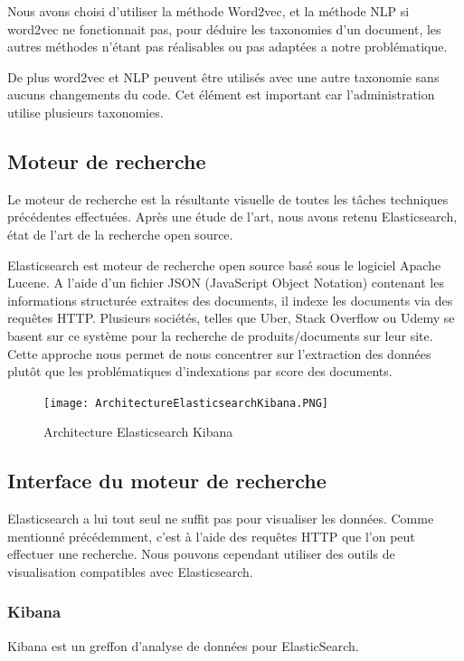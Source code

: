 Nous avons choisi d'utiliser la méthode Word2vec, et la méthode NLP si word2vec ne fonctionnait pas, pour déduire les taxonomies d'un document, les autres méthodes n'étant pas réalisables ou pas adaptées a notre problématique.

De plus word2vec et NLP peuvent être utilisés avec une autre taxonomie sans aucuns changements du code.
Cet élément est important car l'administration utilise plusieurs taxonomies. 


\subsection{Moteur de recherche}
Le moteur de recherche est la résultante visuelle de toutes les tâches techniques précédentes effectuées.
Après une étude de l’art, nous avons retenu Elasticsearch, état de l'art de la recherche open source.

Elasticsearch est moteur de recherche open source basé sous le logiciel Apache Lucene.
A l’aide d’un fichier JSON (JavaScript Object Notation) contenant les informations structurée extraites des documents, il indexe les documents via des requêtes HTTP\@.
Plusieurs sociétés, telles que Uber, Stack Overflow ou Udemy se basent sur ce système pour la recherche de produits/documents sur leur site. 
Cette approche nous permet de nous concentrer sur l'extraction des données plutôt que les problématiques d’indexations par score des documents.

\begin{figure}[h!]
  \centering
  \texttt{[image: ArchitectureElasticsearchKibana.PNG]}
	\caption[]{Architecture Elasticsearch Kibana}
	\label{}
\end{figure}



\subsection{Interface du moteur de recherche}
Elasticsearch a lui tout seul ne suffit pas pour visualiser les données.
Comme mentionné précédemment, c’est à l’aide des requêtes HTTP que l’on peut effectuer une recherche.
Nous pouvons cependant utiliser des outils de visualisation compatibles avec Elasticsearch.

\subsubsection{Kibana}
Kibana est un greffon d'analyse de données pour ElasticSearch.

